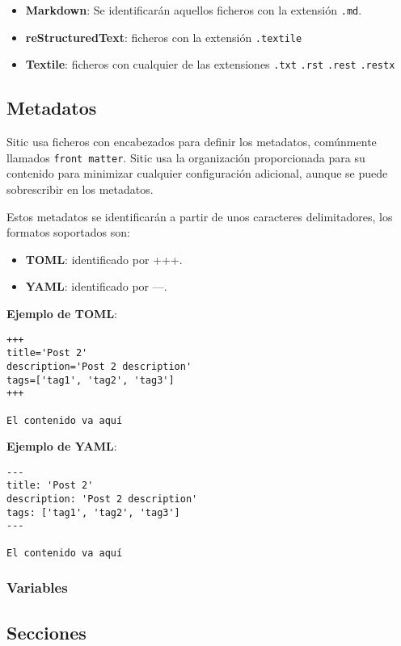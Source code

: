 \begin{itemize}
    \item \textbf{Markdown}: Se identificarán aquellos ficheros con la extensión \texttt{.md}.
    \item \textbf{reStructuredText}: ficheros con la extensión \texttt{.textile}
    \item \textbf{Textile}: ficheros con cualquier de las extensiones \texttt{.txt} \texttt{.rst} \texttt{.rest} \texttt{.restx}
\end{itemize}

\subsection{Metadatos}

Sitic usa ficheros con encabezados para definir los metadatos, comúnmente llamados \texttt{front matter}.
Sitic usa la organización proporcionada para su contenido para minimizar cualquier
configuración adicional, aunque se puede sobrescribir en los metadatos.

Estos metadatos se identificarán a partir de unos caracteres delimitadores, los formatos soportados son:

\begin{itemize}
    \item \textbf{TOML}: identificado por +++.
    \item \textbf{YAML}: identificado por ---.
\end{itemize}

\textbf{Ejemplo de TOML}:

\begin{verbatim}
+++
title='Post 2'
description='Post 2 description'
tags=['tag1', 'tag2', 'tag3']
+++

El contenido va aquí
\end{verbatim}

\textbf{Ejemplo de YAML}:

\begin{verbatim}
---
title: 'Post 2'
description: 'Post 2 description'
tags: ['tag1', 'tag2', 'tag3']
---

El contenido va aquí
\end{verbatim}

\subsubsection{Variables}

\subsection{Secciones}

